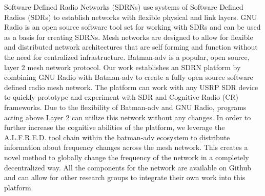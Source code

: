 Software Defined Radio Networks (SDRNs)  use systems of Software Defined Radios (SDRs) to establish networks with flexible physical and link layers. GNU Radio is an open source software tool set for working with SDRs and can be used as a basis for creating SDRNs. Mesh networks are designed to allow for flexible and distributed network architectures that are self forming and function without the need for centralized infrastructure. Batman-adv is a popular, open source, layer 2 mesh network protocol. Our work establishes an SDRN platform by combining GNU Radio with Batman-adv to create a fully open source software defined radio mesh network. The platform can work with any USRP SDR device to quickly prototype and experiment with SDR and Cognitive Radio (CR) frameworks. Due to the flexibility of Batman-adv
and GNU Radio, programs acting above Layer 2 can utilize this network without any changes. In order to further increase the cognitive abilities of the platform, we leverage the A.L.F.R.E.D. tool chain within the batman-adv ecosystem to distribute information about frequency changes across the mesh network. This creates a novel method to globally change the frequency of the network in a completely decentralized way. All the components for the network are available on Github and can allow for other research groups to integrate their own work into this platform.   


